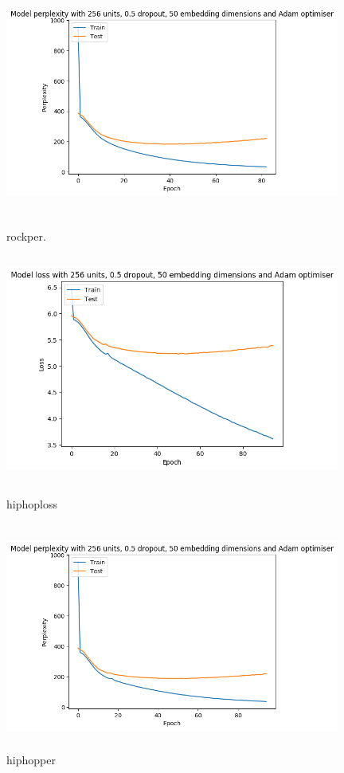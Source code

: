 \begin{figure}[ht]
		\centering
	\includegraphics[width=11cm, height=7.5cm]{./figures/rockper}
	\caption{rockper.}
	\label{fig:popper}

	\includegraphics[width=11cm, height=7.5cm]{./figures/hiphoploss}
	\caption{hiphoploss}
	\label{fig:poploss}

	\includegraphics[width=11cm, height=7.5cm]{./figures/hiphopper}
	\caption{hiphopper}
	\label{fig:popper}
\end{figure}

